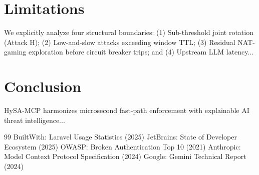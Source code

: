 \documentclass[smallextended]{svjour3}
\begin{document}
\section{Limitations}
We explicitly analyze four structural boundaries: (1) Sub-threshold joint rotation (Attack H); (2) Low-and-slow attacks exceeding window TTL; (3) Residual NAT-gaming exploration before circuit breaker trips; and (4) Upstream LLM latency...

\section{Conclusion}
HySA-MCP harmonizes microsecond fast-path enforcement with explainable AI threat intelligence...

\begin{thebibliography}{99}
 BuiltWith: Laravel Usage Statistics (2025)
 JetBrains: State of Developer Ecosystem (2025)
 OWASP: Broken Authentication Top 10 (2021)
 Anthropic: Model Context Protocol Specification (2024)
 Google: Gemini Technical Report (2024)
\end{thebibliography}
\end{document}

